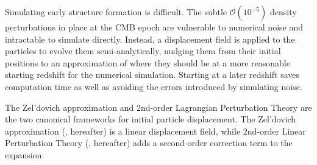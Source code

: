 
Simulating early structure formation is difficult.  The subtle $\mathcal{O}(10^{-5})$ density perturbations in place at the CMB epoch are vulnerable to numerical noise and intractable to simulate directly.  Instead, a displacement field is applied to the particles to evolve them semi-analytically, nudging them from their initial positions to an approximation of where they should be at a more reasonable starting redshift for the numerical simulation.  Starting at a later redshift saves computation time as well as avoiding the errors introduced by simulating noise.


The Zel'dovich approximation \citep{1970A&A.....5...84Z, 1983MNRAS.204..891K, 1985ApJS...57..241E} and 2nd-order Lagrangian Perturbation Theory \citep{1994MNRAS.267..811B, 1994A&A...288..349B, 1995A&A...296..575B, 1998MNRAS.299.1097S, 2005ApJ...634..728S, 2006MNRAS.373..369C, 2010MNRAS.403.1859J} are the two canonical frameworks for initial particle displacement.  The Zel'dovich approximation (\za, hereafter) is a linear displacement field, while 2nd-order Linear Perturbation Theory (\lpt, hereafter) adds a second-order correction term to the expansion.

